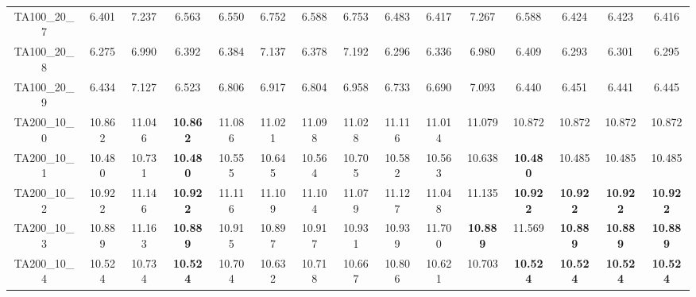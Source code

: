 \begin{tabular}{cc||ccccccccccccc}
TA100\_20\_7       & 6.401            & 7.237            & 6.563            & 6.550            & 6.752            & 6.588            & 6.753            & 6.483            & 6.417            & 7.267            & 6.588            & 6.424            & 6.423            & 6.416           \\ 
TA100\_20\_8       & 6.275            & 6.990            & 6.392            & 6.384            & 7.137            & 6.378            & 7.192            & 6.296            & 6.336            & 6.980            & 6.409            & 6.293            & 6.301            & 6.295           \\ 
TA100\_20\_9       & 6.434            & 7.127            & 6.523            & 6.806            & 6.917            & 6.804            & 6.958            & 6.733            & 6.690            & 7.093            & 6.440            & 6.451            & 6.441            & 6.445           \\ 
TA200\_10\_0       & 10.862           & 11.046           & {\bf 10.862}     & 11.086           & 11.021           & 11.098           & 11.028           & 11.116           & 11.014           & 11.079           & 10.872           & 10.872           & 10.872           & 10.872          \\ 
TA200\_10\_1       & 10.480           & 10.731           & {\bf 10.480}     & 10.555           & 10.645           & 10.564           & 10.705           & 10.582           & 10.563           & 10.638           & {\bf 10.480}     & 10.485           & 10.485           & 10.485          \\ 
TA200\_10\_2       & 10.922           & 11.146           & {\bf 10.922}     & 11.116           & 11.109           & 11.104           & 11.079           & 11.127           & 11.048           & 11.135           & {\bf 10.922}     & {\bf 10.922}     & {\bf 10.922}     & {\bf 10.922}    \\ 
TA200\_10\_3       & 10.889           & 11.163           & {\bf 10.889}     & 10.915           & 10.897           & 10.917           & 10.931           & 10.939           & 11.700           & {\bf 10.889}     & 11.569           & {\bf 10.889}     & {\bf 10.889}     & {\bf 10.889}    \\ 
TA200\_10\_4       & 10.524           & 10.734           & {\bf 10.524}     & 10.704           & 10.632           & 10.718           & 10.667           & 10.806           & 10.621           & 10.703           & {\bf 10.524}     & {\bf 10.524}     & {\bf 10.524}     & {\bf 10.524}    \\ 

\end{tabular}
